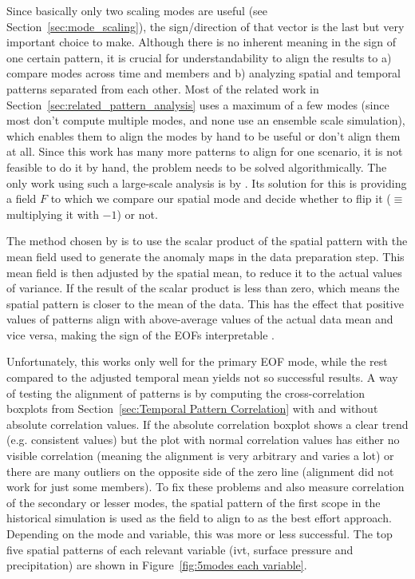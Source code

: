 Since basically only two scaling modes are useful (see Section~\ref{sec:mode_scaling}), the sign/direction of that vector is the last but very important choice to make.
Although there is no inherent meaning in the sign of one certain pattern, it is crucial for understandability to align the results to a) compare modes across time and members and b) analyzing spatial and temporal patterns separated from each other. 
Most of the related work in Section~\ref{sec:related_pattern_analysis} uses a maximum of a few modes (since most don't compute multiple modes, and none use an ensemble scale simulation), which enables them to align the modes by hand to be useful or don't align them at all.
Since this work has many more patterns to align for one scenario, it is not feasible to do it by hand, the problem needs to be solved algorithmically. 
The only work using such a large-scale analysis is by .  
Its solution for this is providing a field $F$ to which we compare our spatial mode and decide whether to flip it ($\equiv$ multiplying it with $-1$) or not. 

The method chosen by \citeauthor{vietinghoffdiss} \cite{vietinghoffdiss} is to use the scalar product of the spatial pattern with the mean field used to generate the anomaly maps in the data preparation step. 
This mean field is then adjusted by the spatial mean, to reduce it to the actual values of variance. 
If the result of the scalar product is less than zero, which means the spatial pattern is closer to the mean of the data. 
This has the effect that positive values of patterns align with above-average values of the actual data mean and vice versa, making the sign of the EOFs interpretable \cite{vietinghoffdiss}.

Unfortunately, this works only well for the primary EOF mode, while the rest compared to the adjusted temporal mean yields not so successful results. 
A way of testing the alignment of patterns is by computing the cross-correlation boxplots from Section~\ref{sec:Temporal Pattern Correlation} with and without absolute correlation values. 
If the absolute correlation boxplot shows a clear trend (e.g. consistent values) but the plot with normal correlation values has either no visible correlation (meaning the alignment is very arbitrary and varies a lot) or there are many outliers on the opposite side of the zero line (alignment did not work for just some members). 
To fix these problems and also measure correlation of the secondary or lesser modes, the spatial pattern of the first scope in the historical simulation is used as the field to align to as the best effort approach. 
Depending on the mode and variable, this was more or less successful. 
The top five spatial patterns of each relevant variable (\ac{ivt}, surface pressure and precipitation) are shown in Figure~\ref{fig:5modes each variable}.



